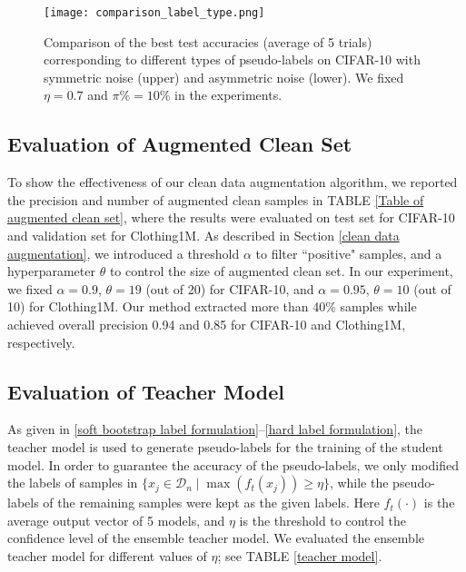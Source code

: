 \documentclass[conference]{IEEEtran}
\begin{document}
\begin{figure}[htb!]
\centering
\texttt{[image: comparison\_label\_type.png]}
\caption{Comparison of the best test accuracies (average of 5 trials) corresponding to different types of pseudo-labels on CIFAR-10 with symmetric noise (upper) and asymmetric noise (lower). We fixed $\eta=0.7$ and $\pi\%=10\%$ in the experiments.}
\label{Comparison types of label}
\end{figure}

\subsection{Evaluation of Augmented Clean Set}
To show the effectiveness of our clean data augmentation algorithm, we reported the precision and number of augmented clean samples in TABLE \ref{Table of augmented clean set}, where the results were evaluated on test set for CIFAR-10 and validation set for Clothing1M. As described in Section \ref{clean data augmentation}, we introduced a threshold $\alpha$ to filter ``positive" samples, and a hyperparameter $\theta$ to control the size of augmented clean set. In our experiment, we fixed $\alpha=0.9$, $\theta=19$ (out of 20) for CIFAR-10, and $\alpha=0.95$, $\theta=10$ (out of 10) for Clothing1M. Our method extracted more than 40\% samples while achieved overall precision 0.94 and 0.85 for CIFAR-10 and Clothing1M, respectively. 





\subsection{Evaluation of Teacher Model}
As given in \eqref{soft bootstrap label formulation}--\eqref{hard label formulation}, 
the teacher model is used to generate pseudo-labels for the training of the student model.
In order to guarantee the accuracy of the pseudo-labels, we only modified the labels of samples in $\{x_j\in \mathcal{D}_n \mid\max(f_t(x_j))\geq\eta \}$, while the pseudo-labels of the remaining samples were kept as the given labels.
Here $f_t(\cdot)$ is the average output vector of 5 models, and $\eta$ is the threshold to control the confidence level of the ensemble teacher model.
We evaluated the ensemble teacher model for different values of $\eta$; see TABLE \ref{teacher model}.
\end{document}
